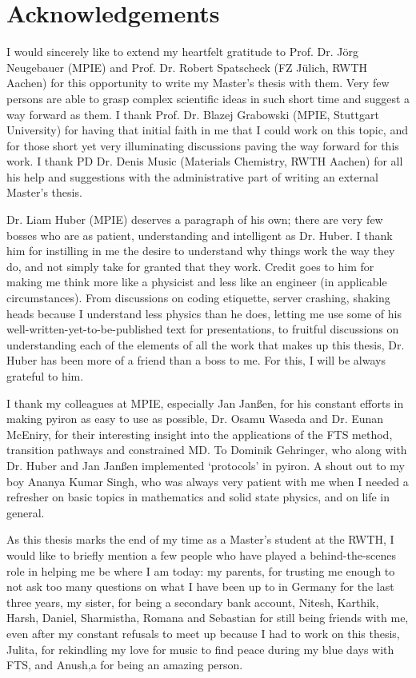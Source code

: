 \documentclass{article}
\begin{document}
\clearpage
\section{Acknowledgements}

I would sincerely like to extend my heartfelt gratitude to Prof. Dr. Jörg Neugebauer (MPIE) and Prof. Dr. Robert Spatscheck (FZ Jülich, RWTH Aachen) for this opportunity to write my Master's thesis with them. Very few persons are able to grasp complex scientific ideas in such short time and suggest a way forward as them. I thank Prof. Dr. Blazej Grabowski (MPIE, Stuttgart University) for having that initial faith in me that I could work on this topic, and for those short yet very illuminating discussions paving the way forward for this work. I thank PD Dr. Denis Music (Materials Chemistry, RWTH Aachen) for all his help and suggestions with the administrative part of writing an external Master's thesis.

Dr. Liam Huber (MPIE) deserves a paragraph of his own; there are very few bosses who are as patient, understanding and intelligent as Dr. Huber. I thank him for instilling in me the desire to understand why things work the way they do, and not simply take for granted that they work. Credit goes to him for making me think more like a physicist and less like an engineer (in applicable circumstances). From discussions on coding etiquette, server crashing, shaking heads because I understand less physics than he does, letting me use some of his well-written-yet-to-be-published text for presentations, to fruitful discussions on understanding each of the elements of all the work that makes up this thesis, Dr. Huber has been more of a friend than a boss to me. For this, I will be always grateful to him.

I thank my colleagues at MPIE, especially Jan Janßen, for his constant efforts in making pyiron as easy to use as possible, Dr. Osamu Waseda and Dr. Eunan McEniry, for their interesting insight into the applications of the FTS method, transition pathways and constrained MD. To Dominik Gehringer, who along with Dr. Huber and Jan Janßen implemented \enquote*{protocols} in pyiron. A shout out to my boy Ananya Kumar Singh, who was always very patient with me when I needed a refresher on basic topics in mathematics and solid state physics, and on life in general. 

As this thesis marks the end of my time as a Master's student at the RWTH, I would like to briefly mention a few people who have played a behind-the-scenes role in helping me be where I am today: my parents, for trusting me enough to not ask too many questions on what I have been up to in Germany for the last three years, my sister, for being a secondary bank account, Nitesh, Karthik, Harsh, Daniel, Sharmistha, Romana and Sebastian for still being friends with me, even after my constant refusals to meet up because I had to work on this thesis, Julita, for rekindling my love for music to find peace during my blue days with FTS, and Anush,a for being an amazing person.
\end{document}
